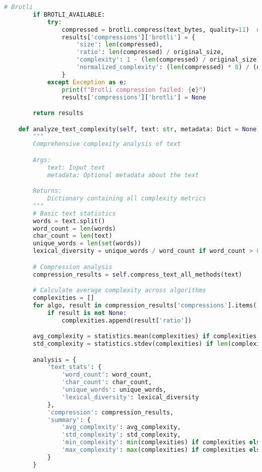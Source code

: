 \documentclass[12pt,a4paper]{report}
\begin{document}
\begin{lstlisting}[language=Python, caption=Complete Compression Analysis Framework]
        # Brotli
        if BROTLI_AVAILABLE:
            try:
                compressed = brotli.compress(text_bytes, quality=11)  # Maximum quality
                results['compressions']['brotli'] = {
                    'size': len(compressed),
                    'ratio': len(compressed) / original_size,
                    'complexity': 1 - (len(compressed) / original_size),
                    'normalized_complexity': (len(compressed) * 8) / (original_size * 8)
                }
            except Exception as e:
                print(f"Brotli compression failed: {e}")
                results['compressions']['brotli'] = None

        return results

    def analyze_text_complexity(self, text: str, metadata: Dict = None) -> Dict:
        """
        Comprehensive complexity analysis of text

        Args:
            text: Input text
            metadata: Optional metadata about the text

        Returns:
            Dictionary containing all complexity metrics
        """
        # Basic text statistics
        words = text.split()
        word_count = len(words)
        char_count = len(text)
        unique_words = len(set(words))
        lexical_diversity = unique_words / word_count if word_count > 0 else 0

        # Compression analysis
        compression_results = self.compress_text_all_methods(text)

        # Calculate average complexity across algorithms
        complexities = []
        for algo, result in compression_results['compressions'].items():
            if result is not None:
                complexities.append(result['ratio'])

        avg_complexity = statistics.mean(complexities) if complexities else 0
        std_complexity = statistics.stdev(complexities) if len(complexities) > 1 else 0

        analysis = {
            'text_stats': {
                'word_count': word_count,
                'char_count': char_count,
                'unique_words': unique_words,
                'lexical_diversity': lexical_diversity
            },
            'compression': compression_results,
            'summary': {
                'avg_complexity': avg_complexity,
                'std_complexity': std_complexity,
                'min_complexity': min(complexities) if complexities else 0,
                'max_complexity': max(complexities) if complexities else 0
            }
        }


\end{lstlisting}
\end{document}
